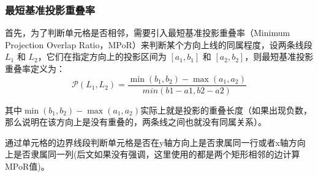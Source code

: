 \documentclass[UTF8,12pt, AutoFakeBold,fontset = founder]{ctexart}
\begin{document}
\subsubsection{最短基准投影重叠率}
首先，为了判断单元格是否相邻，需要引入最短基准投影重叠率（Minimum Projection Overlap Ratio，MPoR）来判断某个方向上线的同属程度，设两条线段 \( L_1 \) 和 \( L_2 \)，它们在指定方向上的投影区间为 \([a_1, b_1]\) 和 \([a_2, b_2]\)，则最短基准投影重叠率定义为：
\begin{equation}
    \mathcal{P}(L_1,L_2) = \frac{\min(b_1, b_2) - \max(a_1, a_2)}{min(b1-a1, b2-a2)}
\label{eq:piol}
\end{equation}


其中$\min(b_1, b_2) - \max(a_1, a_2)$实际上就是投影的重叠长度（如果出现负数，那么说明在该方向上是没有重叠的，两条线之间也就没有同属关系）。

通过单元格的边界线段判断单元格是否在y轴方向上是否隶属同一行或者x轴方向上是否隶属同一列(后文如果没有强调，这里使用的都是两个矩形相邻的边计算MPoR值)。
\end{document}
